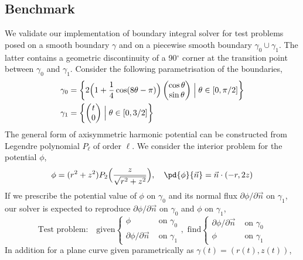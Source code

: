 \documentclass{jfm}
\begin{document}
\subsection{Benchmark}
We validate our implementation of boundary integral solver for test problems posed 
on a smooth boundary $\gamma$ and on a piecewise smooth boundary $\gamma_0\cup\gamma_1$.
The latter contains a geometric discontinuity of a 90$^\circ$ corner
at the transition point between $\gamma_0$ and $\gamma_1$.
Consider the following parametrisation of the boundaries,
\begin{align}
\gamma_0&=\left\{
2 \Big(1+\frac{1}{4}\cos(8\theta - \pi)\Big)
\begin{pmatrix}
\cos\theta\\
\sin\theta
\end{pmatrix}
\Bigm|  \theta \in [0,\pi/2]\right\}\\
\gamma_1&=
\left\{
\begin{pmatrix}
t\\0
\end{pmatrix}
\Bigm|  \theta \in [0,3/2]\right\}
\end{align}
The general form of axisymmetric harmonic potential can be constructed from Legendre polynomial $P_\ell$ of order $\ell$.
We consider the interior problem for the potential $\phi$,
\begin{equation}\label{eq:test_parametrisation}
\phi = (r^2+z^2)P_2\Big(\frac{z}{\sqrt{r^2+z^2}}\Big),\quad
\pd{\phi}{\vec{n}} = \vec{n}\cdot (-r , 2 z )
\end{equation}
If we prescribe the potential value of $\phi$ on $\gamma_0$ and 
its normal flux $\partial \phi /\partial \vec{n}$ on $\gamma_1$,
our solver is expected to reproduce $\partial \phi /\partial \vec{n}$ on $\gamma_0$
and $\phi$ on $\gamma_1$,
\begin{equation}\label{eq:test_problem}
\textrm{Test problem:}\quad\textrm{given}\left\{
\begin{aligned}
\phi &\textrm{ on }\gamma_0\\
\partial \phi /\partial \vec{n}&\textrm{ on }\gamma_1
\end{aligned}\right.,
\,\,\textrm{find}\left\{
\begin{aligned}
\partial \phi /\partial \vec{n}&\textrm{ on }\gamma_0\\
\phi &\textrm{ on }\gamma_1
\end{aligned}\right.
\end{equation}
In addition for a plane curve given parametrically as $\gamma(t) = (r(t), z(t))$,
\end{document}
